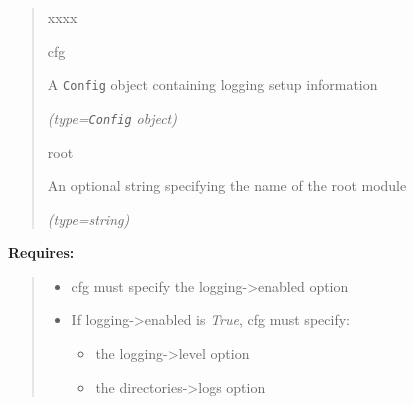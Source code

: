 \begin{boxedminipage}{\funcwidth}
\begin{quote}
\begin{Ventry}{xxxx}
          \item[cfg]

          A \texttt{Config} object containing logging setup information

            {\it (type=\texttt{Config} object)}

          \item[root]

          An optional string specifying the name of the root module

            {\it (type=string)}

        \end{Ventry}

      \end{quote}

\textbf{Requires:}
\begin{quote}
  \begin{itemize}

  \item
    \setlength{\parskip}{0.6ex}
cfg must specify the logging-{\textgreater}enabled option



  \item If logging-{\textgreater}enabled is \textit{True}, cfg must specify:

\begin{itemize}
\setlength{\parskip}{0.6ex}
  \item the logging-{\textgreater}level option

  \item the directories-{\textgreater}logs option

\end{itemize}



\end{itemize}

\end{quote}

    \end{boxedminipage}

    \label{morpher:misc:log_setup:translateLevel}

    \vspace{0.5ex}

